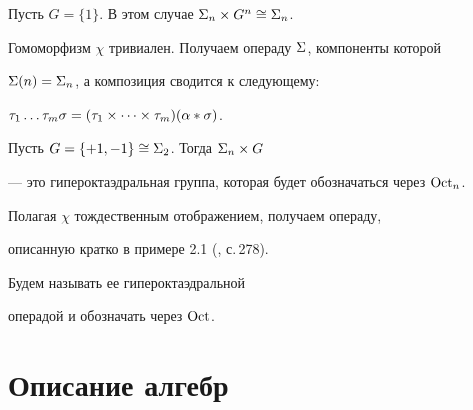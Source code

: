 \begin{exam}


Пусть $G=\{1\}$. В этом случае $\Sigma_n\times G^n\cong \Sigma_n$.


Гомоморфизм $\chi$ тривиален. Получаем операду $\Sigma$, компоненты которой


$\Sigma(n)=\Sigma_n$, а композиция сводится к следующему:


$\tau_1 \dotsc \tau_m \sigma =(\tau_1 \times \dotsb \times \tau_m)(\alpha * \sigma)$.


\end{exam}








\begin{exam}


Пусть $G=\{+1,-1\}\cong \Sigma_2$. Тогда $\Sigma_n\times G$


--- это гипероктаэдральная группа, которая будет обозначаться через $\operatorname{Oct}_n$.


Полагая $\chi$ тождественным отображением, получаем операду,


описанную кратко в примере 2.1 (\cite{Kap}, с.\,278).


Будем называть ее гипероктаэдральной


операдой и обозначать через $\operatorname{Oct}$.


\end{exam}











\section{Описание алгебр}








